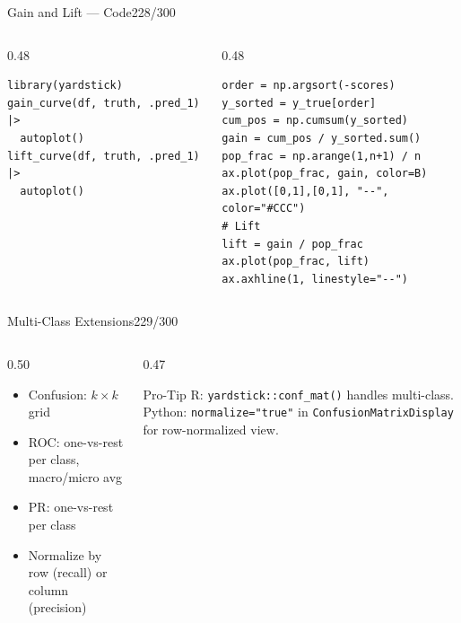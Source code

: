 \documentclass[10pt]{beamer}
\newcommand{\smark}[1]{\hfill{\scriptsize\color{codegray}#1}}
\begin{document}
\begin{frame}[fragile]{Gain and Lift --- Code}\smark{228/300}
\begin{columns}[T]
\begin{column}{0.48\textwidth}
\begin{lstlisting}[style=Rstyle]
library(yardstick)
gain_curve(df, truth, .pred_1) |>
  autoplot()
lift_curve(df, truth, .pred_1) |>
  autoplot()
\end{lstlisting}
\end{column}
\begin{column}{0.48\textwidth}
\begin{lstlisting}[style=Pystyle]
order = np.argsort(-scores)
y_sorted = y_true[order]
cum_pos = np.cumsum(y_sorted)
gain = cum_pos / y_sorted.sum()
pop_frac = np.arange(1,n+1) / n
ax.plot(pop_frac, gain, color=B)
ax.plot([0,1],[0,1], "--", color="#CCC")
# Lift
lift = gain / pop_frac
ax.plot(pop_frac, lift)
ax.axhline(1, linestyle="--")
\end{lstlisting}
\end{column}
\end{columns}
\end{frame}

\begin{frame}{Multi-Class Extensions}\smark{229/300}
\begin{columns}[T]
\begin{column}{0.50\textwidth}
\begin{itemize}
    \item Confusion: $k \times k$ grid
    \item ROC: one-vs-rest per class, macro/micro avg
    \item PR: one-vs-rest per class
    \item Normalize by row (recall) or column (precision)
\end{itemize}
\end{column}
\begin{column}{0.47\textwidth}
\begin{alertblock}{Pro-Tip}
    \scriptsize R: \texttt{yardstick::conf\_mat()} handles multi-class. Python: \texttt{normalize="true"} in \texttt{ConfusionMatrixDisplay} for row-normalized view.
\end{alertblock}
\end{column}
\end{columns}
\end{frame}
\end{document}
